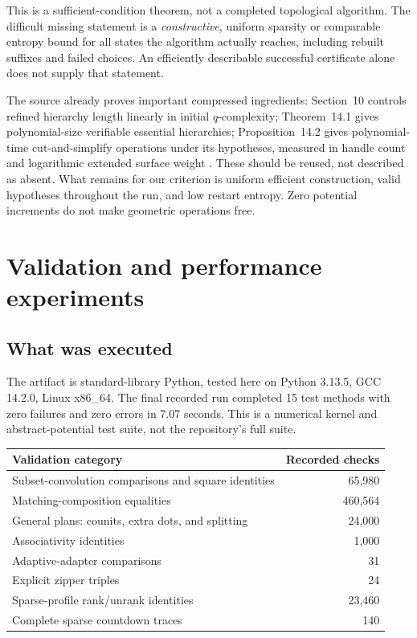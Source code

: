 \documentclass[11pt,letterpaper]{article}
\theoremstyle{definition}
\theoremstyle{remark}
\begin{document}
This is a sufficient-condition theorem, not a completed topological
algorithm. The difficult missing statement is a \emph{constructive},
uniform sparsity or comparable entropy bound for all states the algorithm
actually reaches, including rebuilt suffixes and failed choices.
An efficiently describable successful certificate alone does not supply
that statement.

The source already proves important compressed ingredients: Section~10
controls refined hierarchy length linearly in initial $q$-complexity;
Theorem~14.1 gives polynomial-size verifiable essential hierarchies;
Proposition~14.2 gives polynomial-time cut-and-simplify operations under its
hypotheses, measured in handle count and logarithmic extended surface
weight \cite{lackenby}. These should be reused, not described as absent.
What remains for our criterion is uniform efficient construction, valid
hypotheses throughout the run, and low restart entropy. Zero potential
increments do not make geometric operations free.

\section{Validation and performance experiments}
\label{sec:experiments}
\subsection{What was executed}
The artifact is standard-library Python, tested here on Python 3.13.5,
GCC 14.2.0, Linux x86\_64. The final recorded run completed 15 test methods
with zero failures and zero errors in 7.07 seconds. This is a numerical
kernel and abstract-potential test suite, not the repository's full suite.

\begin{center}
\begin{tabular}{lr}
\toprule
Validation category & Recorded checks\\
\midrule
Subset-convolution comparisons and square identities & 65,980\\
Matching-composition equalities & 460,564\\
General plans: counits, extra dots, and splitting & 24,000\\
Associativity identities & 1,000\\
Adaptive-adapter comparisons & 31\\
Explicit zipper triples & 24\\
Sparse-profile rank/unrank identities & 23,460\\
Complete sparse countdown traces & 140\\
\bottomrule
\end{tabular}
\end{center}
\end{document}
